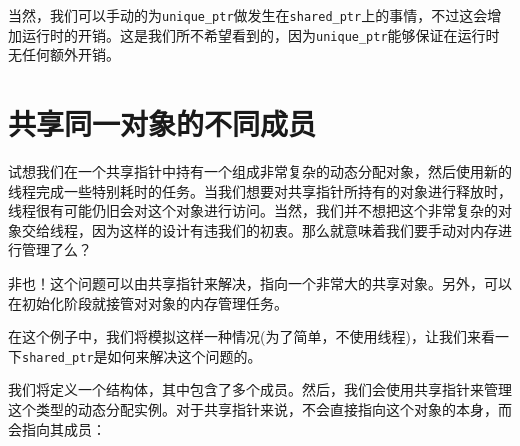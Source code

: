 当然，我们可以手动的为\texttt{unique\_ptr}做发生在\texttt{shared\_ptr}上的事情，不过这会增加运行时的开销。这是我们所不希望看到的，因为\texttt{unique\_ptr}能够保证在运行时无任何额外开销。


\section{共享同一对象的不同成员}

试想我们在一个共享指针中持有一个组成非常复杂的动态分配对象，然后使用新的线程完成一些特别耗时的任务。当我们想要对共享指针所持有的对象进行释放时，线程很有可能仍旧会对这个对象进行访问。当然，我们并不想把这个非常复杂的对象交给线程，因为这样的设计有违我们的初衷。那么就意味着我们要手动对内存进行管理了么？

非也！这个问题可以由共享指针来解决，指向一个非常大的共享对象。另外，可以在初始化阶段就接管对对象的内存管理任务。

在这个例子中，我们将模拟这样一种情况(为了简单，不使用线程)，让我们来看一下\texttt{shared\_ptr}是如何来解决这个问题的。


我们将定义一个结构体，其中包含了多个成员。然后，我们会使用共享指针来管理这个类型的动态分配实例。对于共享指针来说，不会直接指向这个对象的本身，而会指向其成员：

